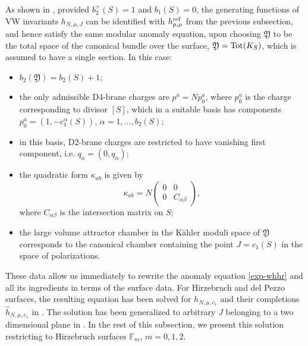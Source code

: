 \documentclass[12pt,letterpaper]{JHEP3}
\def\be{\begin{equation}}
\def\ee{\end{equation}}
\def\({\left(}
\def\){\right)}
\newcommand{\IF}{\mathds{F}}
\def\CY{\mathfrak{Y}}
\def\hr{h^{\rm ref}}
\def\whh{\widehat h}
\begin{document}
As shown in \cite{Alexandrov:2019rth}, provided $b_2^+(S)=1$ and $b_1(S)=0$, the generating functions of VW invariants 
$h_{N,\mu,J}$ can be identified with $\hr_{p,\mu}$
from the previous subsection, and hence satisfy the same modular anomaly equation, 
upon choosing $\CY$ to be the total space of the canonical bundle over 
the surface, $\CY={\rm Tot}(K_S)$, which is assumed to have a single section. 
In this case:
\begin{itemize}
\item 
$b_2(\CY)=b_2(S)+1$;

\item 
the only admissible D4-brane charges are $p^a=Np_0^a$, where $p_0^a$ is the charge corresponding to
divisor $[S]$, which in a suitable basis has components $p_0^a=(1,-c_1^\alpha(S))$, $\alpha=1,\dots,b_2(S)$;
	
\item 
in this basis, D2-brane charges are restricted to have vanishing first component, i.e. $q_a=(0,q_\alpha)$;

\item 
the quadratic form $\kappa_{ab}$ is given by
\be 
\kappa_{ab}=N\(\begin{array}{cc}
	0 & 0 \\ 0 & C_{\alpha\beta}
	\end{array}\), 
\ee 
where $C_{\alpha\beta}$ is the intersection matrix on $S$;

\item 
the large volume attractor chamber in the K\"ahler moduli space of $\CY$ corresponds to the canonical chamber 
containing the point $J=c_1(S)$ in the space of polarizations.
\end{itemize}  
These data allow us immediately to rewrite the anomaly equation \eqref{exp-whhr} and all its ingredients 
in terms of the surface data.
For Hirzebruch and del Pezzo surfaces, the resulting equation has been solved for $h_{N,\mu,c_1}$ 
and their completions $\whh_{N,\mu,c_1}$ in \cite{Alexandrov:2020bwg}.
The solution has been generalized to arbitrary $J$ belonging to a two dimensional plane in \cite{Alexandrov:2020dyy}.
In the rest of this subsection, we present this solution restricting to Hirzebruch surfaces $\IF_m$, $m=0,1,2$.
\end{document}
